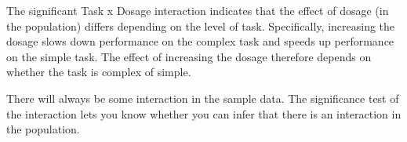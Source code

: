 \documentclass[a4paper,12pt]{article}
\begin{document}
The significant Task x Dosage interaction indicates that the effect of dosage (in the population) differs depending on the level of task. Specifically, increasing the dosage slows down performance on the complex task and speeds up performance on the simple task. The effect of increasing the dosage therefore depends on whether the task is complex of simple.

There will always be some interaction in the sample data. The significance test of the interaction lets you know whether you can infer that there is an interaction in the population.
\end{document}
